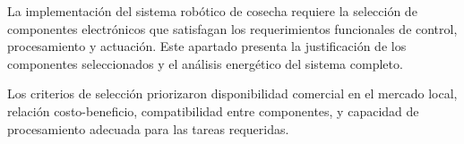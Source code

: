 La implementación del sistema robótico de cosecha requiere la selección de componentes electrónicos que satisfagan los requerimientos funcionales de control, procesamiento y actuación. Este apartado presenta la justificación de los componentes seleccionados y el análisis energético del sistema completo.

Los criterios de selección priorizaron disponibilidad comercial en el mercado local, relación costo-beneficio, compatibilidad entre componentes, y capacidad de procesamiento adecuada para las tareas requeridas.